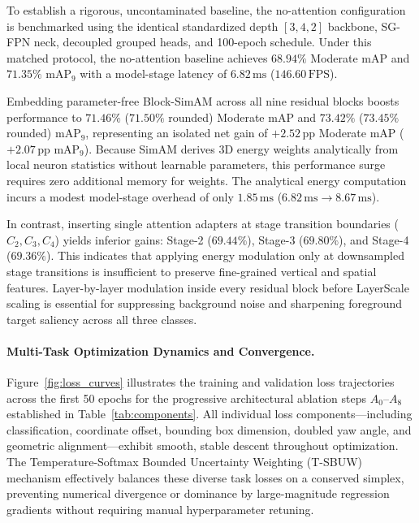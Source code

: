 

To establish a rigorous, uncontaminated baseline, the no-attention configuration is benchmarked using the identical standardized depth $[3, 4, 2]$ backbone, SG-FPN neck, decoupled grouped heads, and 100-epoch schedule. Under this matched protocol, the no-attention baseline achieves $68.94\%$ Moderate mAP and $71.35\%$ $\mathrm{mAP}_9$ with a model-stage latency of $6.82\,\text{ms}$ ($146.60\,\text{FPS}$). 

Embedding parameter-free Block-SimAM across all nine residual blocks boosts performance to $71.46\%$ ($71.50\%$ rounded) Moderate mAP and $73.42\%$ ($73.45\%$ rounded) $\mathrm{mAP}_9$, representing an isolated net gain of $+2.52\,\text{pp}$ Moderate mAP ($+2.07\,\text{pp}$ $\mathrm{mAP}_9$). Because SimAM derives 3D energy weights analytically from local neuron statistics without learnable parameters, this performance surge requires zero additional memory for weights. The analytical energy computation incurs a modest model-stage overhead of only $1.85\,\text{ms}$ ($6.82\,\text{ms} \to 8.67\,\text{ms}$).

In contrast, inserting single attention adapters at stage transition boundaries ($C_2, C_3, C_4$) yields inferior gains: Stage-2 ($69.44\%$), Stage-3 ($69.80\%$), and Stage-4 ($69.36\%$). This indicates that applying energy modulation only at downsampled stage transitions is insufficient to preserve fine-grained vertical and spatial features. Layer-by-layer modulation inside every residual block before LayerScale scaling is essential for suppressing background noise and sharpening foreground target saliency across all three classes.

\paragraph{Multi-Task Optimization Dynamics and Convergence.}
Figure~\ref{fig:loss_curves} illustrates the training and validation loss trajectories across the first 50 epochs for the progressive architectural ablation steps $A_0\text{--}A_8$ established in Table~\ref{tab:components}. All individual loss components—including classification, coordinate offset, bounding box dimension, doubled yaw angle, and geometric alignment—exhibit smooth, stable descent throughout optimization. The Temperature-Softmax Bounded Uncertainty Weighting (T-SBUW) mechanism effectively balances these diverse task losses on a conserved simplex, preventing numerical divergence or dominance by large-magnitude regression gradients without requiring manual hyperparameter retuning.

